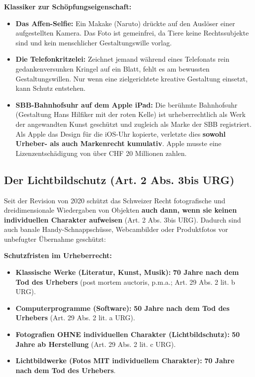 \begin{example}
    \textbf{Klassiker zur Schöpfungseigenschaft:}
    \begin{itemize}
        \item \textbf{Das Affen-Selfie:} Ein Makake (Naruto) drückte auf den Auslöser einer aufgestellten Kamera. Das Foto ist gemeinfrei, da Tiere keine Rechtssubjekte sind und kein menschlicher Gestaltungswille vorlag.
        \item \textbf{Die Telefonkritzelei:} Zeichnet jemand während eines Telefonats rein gedankenversunken Kringel auf ein Blatt, fehlt es am bewussten Gestaltungswillen. Nur wenn eine zielgerichtete kreative Gestaltung einsetzt, kann Schutz entstehen.
        \item \textbf{SBB-Bahnhofsuhr auf dem Apple iPad:} Die berühmte Bahnhofsuhr (Gestaltung Hans Hilfiker mit der roten Kelle) ist urheberrechtlich als Werk der angewandten Kunst geschützt und zugleich als Marke der SBB registriert. Als Apple das Design für die iOS-Uhr kopierte, verletzte dies \textbf{sowohl Urheber- als auch Markenrecht kumulativ}. Apple musste eine Lizenzentschädigung von über CHF 20 Millionen zahlen.
    \end{itemize}
\end{example}

\subsection{Der Lichtbildschutz (Art. 2 Abs. 3bis URG)}

Seit der Revision von 2020 schützt das Schweizer Recht fotografische und dreidimensionale Wiedergaben von Objekten \textbf{auch dann, wenn sie keinen individuellen Charakter aufweisen} (Art. 2 Abs. 3bis URG). Dadurch sind auch banale Handy-Schnappschüsse, Webcambilder oder Produktfotos vor unbefugter Übernahme geschützt:

\begin{theorem}
    \textbf{Schutzfristen im Urheberrecht:}
    \begin{itemize}
        \item \textbf{Klassische Werke (Literatur, Kunst, Musik):} \textbf{70 Jahre nach dem Tod des Urhebers} (post mortem auctoris, p.m.a.; Art. 29 Abs. 2 lit. b URG).
        \item \textbf{Computerprogramme (Software):} \textbf{50 Jahre nach dem Tod des Urhebers} (Art. 29 Abs. 2 lit. a URG).
        \item \textbf{Fotografien OHNE individuellen Charakter (Lichtbildschutz):} \textbf{50 Jahre ab Herstellung} (Art. 29 Abs. 2 lit. c URG).
        \item \textbf{Lichtbildwerke (Fotos MIT individuellem Charakter):} \textbf{70 Jahre nach dem Tod des Urhebers}.
    \end{itemize}
\end{theorem}

